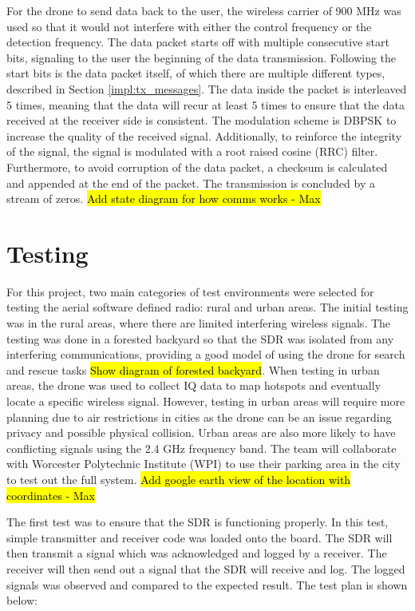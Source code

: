 For the drone to send data back to the user, the wireless carrier of 900 MHz was used so that it would not interfere with either the control frequency or the detection frequency. The data packet starts off with multiple consecutive start bits, signaling to the user the beginning of the data transmission. Following the start bits is the data packet itself, of which there are multiple different types, described in Section \ref{impl:tx_messages}. The data inside the packet is interleaved 5 times, meaning that the data will recur at least 5 times to ensure that the data received at the receiver side is consistent. The modulation scheme is DBPSK to increase the quality of the received signal. Additionally, to reinforce the integrity of the signal, the signal is modulated with a root raised cosine (RRC) filter. Furthermore, to avoid corruption of the data packet, a checksum is calculated and appended at the end of the packet. The transmission is concluded by a stream of zeros. \hl{Add state diagram for how comms works - Max}\par

\section{Testing}
For this project, two main categories of test environments were selected for testing the aerial software defined radio: rural and urban areas. The initial testing was in the rural areas, where there are limited interfering wireless signals. The testing was done in a forested backyard so that the SDR was isolated from any interfering communications, providing a good model of using the drone for search and rescue tasks \hl{Show diagram of forested backyard}. When testing in urban areas, the drone was used to collect IQ data to map hotspots and eventually locate a specific wireless signal. However, testing in urban areas will require more planning due to air restrictions in cities as the drone can be an issue regarding privacy and possible physical collision. Urban areas are also more likely to have conflicting signals using the 2.4 GHz frequency band. The team will collaborate with Worcester Polytechnic Institute (WPI) to use their parking area in the city to test out the full system. \hl{Add google earth view of the location with coordinates - Max} \par
 
The first test was to ensure that the SDR is functioning properly. In this test, simple transmitter and receiver code was loaded onto the board. The SDR will then transmit a signal which was acknowledged and logged by a receiver. The receiver will then send out a signal that the SDR will receive and log. The logged signals was observed and compared to the expected result. The test plan is shown below:

